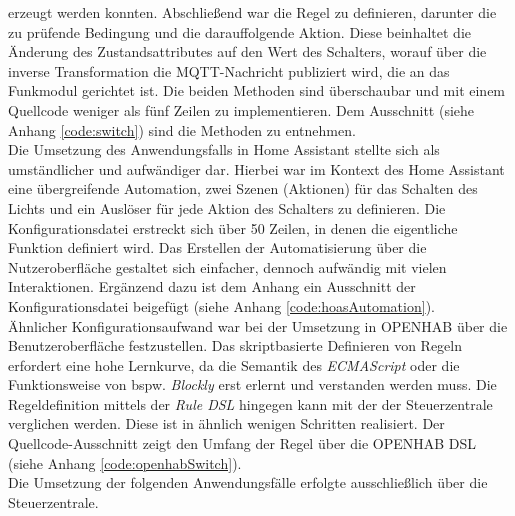     erzeugt werden konnten. Abschließend war die Regel zu definieren, darunter die zu prüfende Bedingung und die darauffolgende Aktion. Diese beinhaltet die Änderung des Zustandsattributes auf den Wert 
    des Schalters, worauf über die inverse Transformation die \acs{MQTT}-Nachricht publiziert wird, die an das Funkmodul gerichtet ist. 
    Die beiden Methoden sind überschaubar und mit einem Quellcode weniger als fünf Zeilen zu implementieren. Dem Ausschnitt (siehe Anhang \ref{code:switch}) 
    sind die Methoden zu entnehmen. 
    \\
    Die Umsetzung des Anwendungsfalls in Home Assistant stellte sich als umständlicher und aufwändiger dar. Hierbei war im Kontext des Home Assistant 
    eine übergreifende Automation, zwei Szenen (Aktionen) für das Schalten des Lichts und ein Auslöser für jede Aktion des Schalters zu definieren. Die Konfigurationsdatei 
    erstreckt sich über 50 Zeilen, in denen die eigentliche Funktion definiert wird. Das Erstellen der Automatisierung über die Nutzeroberfläche gestaltet sich einfacher, dennoch 
    aufwändig mit vielen Interaktionen. Ergänzend dazu ist dem Anhang ein Ausschnitt der Konfigurationsdatei beigefügt (siehe Anhang \ref{code:hoasAutomation}).
    \\
    \linebreak
    Ähnlicher Konfigurationsaufwand war bei der Umsetzung in \acs{OPENHAB} über die Benutzeroberfläche festzustellen. Das skriptbasierte Definieren von Regeln erfordert eine 
    hohe Lernkurve, da die Semantik  des \textit{ECMAScript} oder die Funktionsweise von bspw. \textit{Blockly} erst erlernt und verstanden werden muss. Die Regeldefinition 
    mittels der \textit{Rule \acs{DSL}} hingegen kann mit der der Steuerzentrale verglichen werden. Diese ist in ähnlich wenigen Schritten realisiert. Der 
    Quellcode-Ausschnitt zeigt den Umfang der Regel über die \acs{OPENHAB} \acs{DSL} (siehe Anhang \ref{code:openhabSwitch}). 
    \\
    \linebreak
    Die Umsetzung der folgenden Anwendungsfälle erfolgte ausschließlich über die Steuerzentrale.


